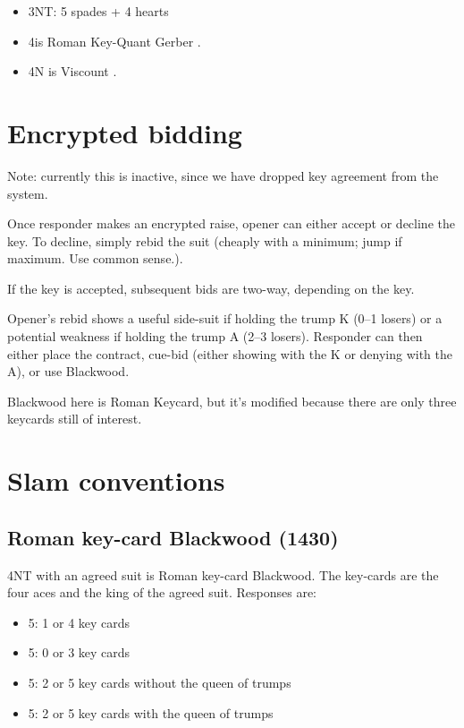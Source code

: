 \documentclass[a4paper,14pt]{extarticle}
\begin{document}
\begin{itemize}
\item 3NT: 5 spades + 4 hearts

\item 4\clubs is Roman Key-Quant Gerber .
\item 4N is Viscount .
\end{itemize}

\newpage

\section{Encrypted bidding}
\label{sec:encryption}

Note: currently this is inactive, since we have dropped key agreement from the system.

Once responder makes an encrypted raise, opener can either accept or decline
the key.  To decline, simply rebid the suit (cheaply with a minimum; jump if
maximum.  Use common sense.).

If the key is accepted, subsequent bids are two-way, depending on the key.

Opener's rebid shows a useful side-suit if holding the trump
K (0--1 losers) or a potential weakness if holding the trump A (2--3 losers).
Responder can then either place the contract, cue-bid (either showing with the
K or denying with the A), or use Blackwood.

Blackwood here is Roman Keycard, but it's modified because there are only three keycards
still of interest.

\section{Slam conventions}
\label{sec:slam}

\subsection{Roman key-card Blackwood (1430)}
\label{sec:rkcb}

4NT with an agreed suit is Roman key-card Blackwood. The key-cards are the four aces
and the king of the agreed suit. Responses are:

\begin{itemize}
\item 5\clubs: 1 or 4 key cards
\item 5\diamonds: 0 or 3 key cards
\item 5\hearts: 2 or 5 key cards without the queen of trumps
\item 5\spades: 2 or 5 key cards with the queen of trumps
\end{itemize}
\end{document}

